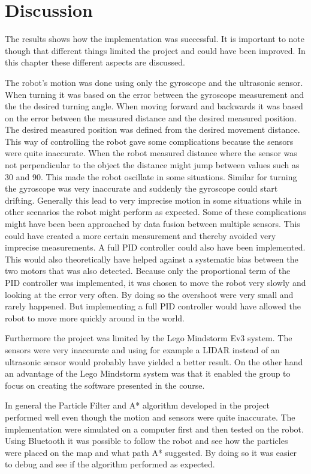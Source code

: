 \chapter{Discussion}
\label{chp:disc}
The results shows how the implementation was successful. It is important to note though that different things limited the project and could have been improved. In this chapter these different aspects are discussed.

The robot's motion was done using only the gyroscope and the ultrasonic sensor. When turning it was based on the error between the gyroscope measurement and the the desired turning angle. When moving forward and backwards it was based on the error between the measured distance and the desired measured position. The desired measured position was defined from the desired movement distance. This way of controlling the robot gave some complications because the sensors were quite inaccurate. When the robot measured distance where the sensor was not perpendicular to the object the distance might jump between values such as 30 and 90. This made the robot oscillate in some situations. Similar for turning the gyroscope was very inaccurate and suddenly the gyroscope could start drifting. Generally this lead to very imprecise motion in some situations while in other scenarios the robot might perform as expected. Some of these complications might have been been approached by data fusion between multiple sensors. This could have created a more certain measurement and thereby avoided very imprecise measurements. A full PID controller could also have been implemented. This would also theoretically have helped against a systematic bias between the two motors that was also detected. Because only the proportional term of the PID controller was implemented, it was chosen to move the robot very slowly and looking at the error very often. By doing so the overshoot were very small and rarely happened. But implementing a full PID controller would have allowed the robot to move more quickly around in the world.

Furthermore the project was limited by the Lego Mindstorm Ev3 system. The sensors were very inaccurate and using for example a LIDAR instead of an ultrasonic sensor would probably have yielded a better result. On the other hand an advantage of the Lego Mindstorm system was that it enabled the group to focus on creating the software presented in the course.

In general the Particle Filter and A* algorithm developed in the project performed well even though the motion and sensors were quite inaccurate. The implementation were simulated on a computer first and then tested on the robot. Using Bluetooth it was possible to follow the robot and see how the particles were placed on the map and what path A* suggested. By doing so it was easier to debug and see if the algorithm performed as expected.